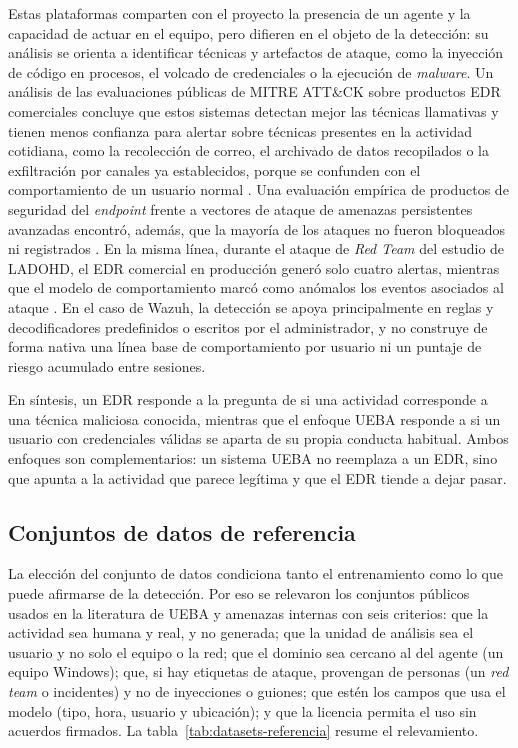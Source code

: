 Estas plataformas comparten con el proyecto la presencia de un agente y la capacidad de actuar en el equipo, pero difieren en el objeto de la detección: su análisis se orienta a identificar técnicas y artefactos de ataque, como la inyección de código en procesos, el volcado de credenciales o la ejecución de \emph{malware}. Un análisis de las evaluaciones públicas de MITRE ATT\&CK sobre productos EDR comerciales concluye que estos sistemas detectan mejor las técnicas llamativas y tienen menos confianza para alertar sobre técnicas presentes en la actividad cotidiana, como la recolección de correo, el archivado de datos recopilados o la exfiltración por canales ya establecidos, porque se confunden con el comportamiento de un usuario normal \parencite{Shen2024}. Una evaluación empírica de productos de seguridad del \emph{endpoint} frente a vectores de ataque de amenazas persistentes avanzadas encontró, además, que la mayoría de los ataques no fueron bloqueados ni registrados \parencite{Karantzas2021}. En la misma línea, durante el ataque de \emph{Red Team} del estudio de LADOHD, el EDR comercial en producción generó solo cuatro alertas, mientras que el modelo de comportamiento marcó como anómalos los eventos asociados al ataque \parencite{VillarrealVasquez2021}. En el caso de Wazuh, la detección se apoya principalmente en reglas y decodificadores predefinidos o escritos por el administrador, y no construye de forma nativa una línea base de comportamiento por usuario ni un puntaje de riesgo acumulado entre sesiones.

En síntesis, un EDR responde a la pregunta de si una actividad corresponde a una técnica maliciosa conocida, mientras que el enfoque UEBA responde a si un usuario con credenciales válidas se aparta de su propia conducta habitual. Ambos enfoques son complementarios: un sistema UEBA no reemplaza a un EDR, sino que apunta a la actividad que parece legítima y que el EDR tiende a dejar pasar.

\subsection{Conjuntos de datos de referencia}\label{sec:ea-datasets}
La elección del conjunto de datos condiciona tanto el entrenamiento como lo que puede afirmarse de la detección. Por eso se relevaron los conjuntos públicos usados en la literatura de UEBA y amenazas internas con seis criterios: que la actividad sea humana y real, y no generada; que la unidad de análisis sea el usuario y no solo el equipo o la red; que el dominio sea cercano al del agente (un equipo Windows); que, si hay etiquetas de ataque, provengan de personas (un \emph{red team} o incidentes) y no de inyecciones o guiones; que estén los campos que usa el modelo (tipo, hora, usuario y ubicación); y que la licencia permita el uso sin acuerdos firmados. La tabla~\ref{tab:datasets-referencia} resume el relevamiento.

